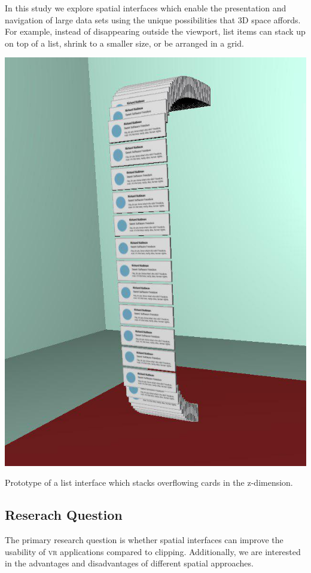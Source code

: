 \documentclass{tufte-book} %
\begin{document}
In this study we explore spatial interfaces which enable the presentation and navigation of large data sets using the unique possibilities that 3D space affords. For example, instead of disappearing outside the viewport, list items can stack up on top of a list, shrink to a smaller size, or be arranged in a grid.

\begin{marginfigure}
  \includegraphics[width=\linewidth]{email.png}
  \caption{Prototype of a list interface which stacks overflowing cards in the z-dimension.}
  \label{fig:email}
\end{marginfigure}

\subsection{Reserach Question}
The primary research question is whether spatial interfaces can improve the usability of \textsc{vr} applications compared to clipping. Additionally, we are interested in the advantages and disadvantages of different spatial approaches.
\end{document}
